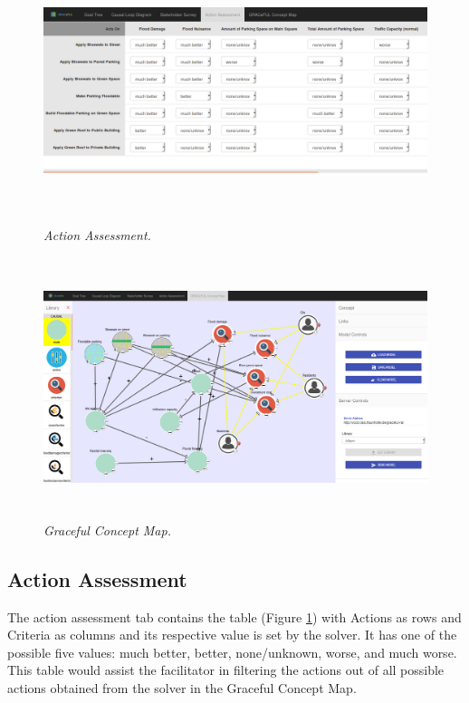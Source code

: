\documentclass[a4paper]{article}
\begin{document}
\begin{figure}[H]
\begin{center}
\includegraphics[width=6in, height=3in]{img/assess.png}
\caption{\small \sl Action Assessment.\label{fig:assess}}
\end{center}
\end{figure}

\begin{figure}[H]
\begin{center}
\includegraphics[height=3in,width=5in]{img/gcm.png}
\caption{\small \sl Graceful Concept Map.\label{fig:gcm}}
\end{center}
\end{figure}

\subsection{Action Assessment}

The action assessment tab contains the table (Figure \ref{fig:assess}) with Actions as rows and Criteria as columns and its respective value is set by the solver. It has one of the possible five values: much better, better, none/unknown, worse, and much worse. This table would assist the facilitator in filtering the actions out of all possible actions obtained from the solver in the Graceful Concept Map.
\end{document}
